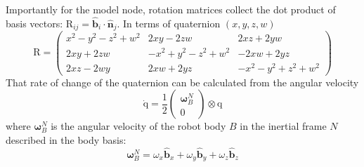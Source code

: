 \documentclass[lettersize,journal]{IEEEtran}
\begin{document}
Importantly for the model node, rotation matrices collect the dot product of basis vectors: $\mathrm{R}_{ij} = \mathbf{\hat{b}}_i \cdot \mathbf{\hat{n}}_j$. In terms of quaternion $(x, y, z, w)$
\begin{equation}
  \mathrm{R}=\left(
  \begin{smallmatrix}
    x^2-y^2-z^2+w^2 & 2xy-2zw & 2xz+2yw \\
    2xy+2zw & -x^2+y^2-z^2+w^2 & -2xw+2yz \\
    2xz-2wy & 2xw+2yz & -x^2-y^2+z^2+w^2
  \end{smallmatrix} 
  \right) \label{EQN:RotationMatrix}
\end{equation}
That rate of change of the quaternion can be calculated from the angular velocity
\begin{equation}
  \mathrm{\dot{q}} = \frac{1}{2}
  \begin{pmatrix}
    \boldsymbol\omega^N_B \\
    0
  \end{pmatrix}
  \otimes \mathrm{q} \label{EQN:QuaternionVelocity}
\end{equation}
where $\boldsymbol\omega^N_B$ is the angular velocity of the robot body $B$ in the inertial frame $N$ described in the body basis:
\begin{equation}
  \boldsymbol\omega^N_B = \omega_x \mathbf{\hat{b}}_x + \omega_y \mathbf{\hat{b}}_y + \omega_z \mathbf{\hat{b}}_z \label{EQN:AngularVelocity}
\end{equation}
\end{document}
